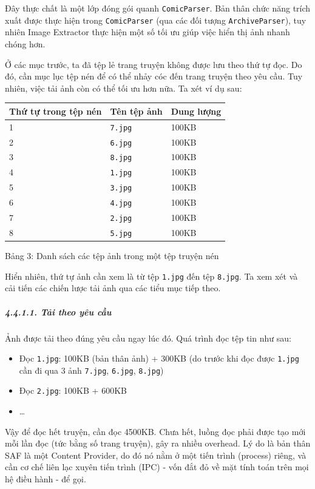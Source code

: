 \documentclass[
]{article}
\begin{document}
Đây thực chất là một lớp đóng gói quanh \texttt{ComicParser}. Bản thân
chức năng trích xuất được thực hiện trong \texttt{ComicParser} (qua các
đối tượng \texttt{ArchiveParser}), tuy nhiên Image Extractor thực hiện
một số tối ưu giúp việc hiển thị ảnh nhanh chóng hơn.

Ở các mục trước, ta đã tệp lẻ trang truyện không được lưu theo thứ tự
đọc. Do đó, cần mục lục tệp nén để có thể nhảy cóc đến trang truyện theo
yêu cầu. Tuy nhiên, việc tải ảnh còn có thể tối ưu hơn nữa. Ta xét ví dụ
sau:

\begin{longtable}[]{@{}lll@{}}
\toprule
Thứ tự trong tệp nén & Tên tệp ảnh & Dung lượng \\
\midrule
\endhead
1 & \texttt{7.jpg} & 100KB \\
2 & \texttt{6.jpg} & 100KB \\
3 & \texttt{8.jpg} & 100KB \\
4 & \texttt{1.jpg} & 100KB \\
5 & \texttt{3.jpg} & 100KB \\
6 & \texttt{4.jpg} & 100KB \\
7 & \texttt{2.jpg} & 100KB \\
8 & \texttt{5.jpg} & 100KB \\
\bottomrule
\end{longtable}

Bảng 3: Danh sách các tệp ảnh trong một tệp truyện nén

Hiển nhiên, thứ tự ảnh cần xem là từ tệp \texttt{1.jpg} đến tệp
\texttt{8.jpg}. Ta xem xét và cải tiến các chiến lược tải ảnh qua các
tiểu mục tiếp theo.

\hypertarget{tux1ea3i-theo-yuxeau-cux1ea7u}{%
\subparagraph{4.4.1.1. Tải theo yêu
cầu}\label{tux1ea3i-theo-yuxeau-cux1ea7u}}

Ảnh được tải theo đúng yêu cầu ngay lúc đó. Quá trình đọc tệp tin như
sau:

\begin{itemize}
\item
  Đọc \texttt{1.jpg}: 100KB (bản thân ảnh) + 300KB (do trước khi đọc
  được \texttt{1.jpg} cần đi qua 3 ảnh \texttt{7.jpg}, \texttt{6.jpg},
  \texttt{8.jpg})
\item
  Đọc \texttt{2.jpg}: 100KB + 600KB
\item
  \ldots{}
\end{itemize}

Vậy để đọc hết truyện, cần đọc 4500KB. Chưa hết, luồng đọc phải được tạo
mới mỗi lần đọc (tức bằng số trang truyện), gây ra nhiều overhead. Lý do
là bản thân SAF là một Content Provider, do đó nó nằm ở một tiến trình
(process) riêng, và cần cơ chế liên lạc xuyên tiến trình (IPC) - vốn đắt
đỏ về mặt tính toán trên mọi hệ điều hành - để gọi.
\end{document}
